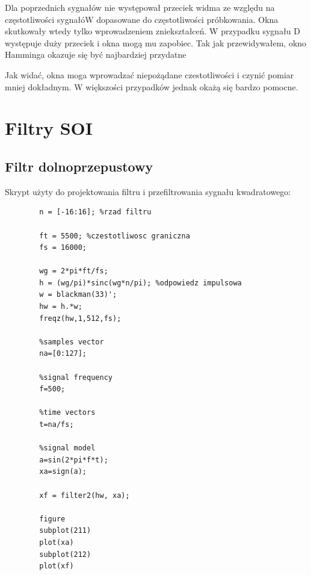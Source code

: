 \documentclass[12pt,titlepage]{report}
\begin{document}
Dla poprzednich sygnałów nie występował przeciek widma ze względu na częstotliwości sygnałóW dopasowane do częstotliwości próbkowania. Okna skutkowały wtedy tylko wprowadzeniem zniekształceń. W przypadku sygnału D występuje duży przeciek i okna mogą mu zapobiec. Tak jak przewidywałem, okno Hamminga okazuje się być najbardziej przydatne
\par
Jak widać, okna moga wprowadzać niepożądane czestotliwości i czynić pomiar mniej dokładnym. W większości przypadków jednak okażą się bardzo pomocne.
\newpage

\section{Filtry SOI}
\subsection{Filtr dolnoprzepustowy}
Skrypt użyty do projektowania filtru i przefiltrowania sygnału kwadratowego:
\begin{multicols}{3}
	{
		\tiny
		\begin{verbatim}
		n = [-16:16]; %rzad filtru
		
		ft = 5500; %czestotliwosc graniczna
		fs = 16000;
		
		wg = 2*pi*ft/fs;
		h = (wg/pi)*sinc(wg*n/pi); %odpowiedz impulsowa
		w = blackman(33)';
		hw = h.*w;
		freqz(hw,1,512,fs);
		
		%samples vector
		na=[0:127];
		
		%signal frequency
		f=500;
		
		%time vectors
		t=na/fs;
		
		%signal model
		a=sin(2*pi*f*t);
		xa=sign(a);
		
		xf = filter2(hw, xa);
		
		figure
		subplot(211)
		plot(xa)
		subplot(212)
		plot(xf)
		\end{verbatim}
	}
\end{multicols}
\end{document}
